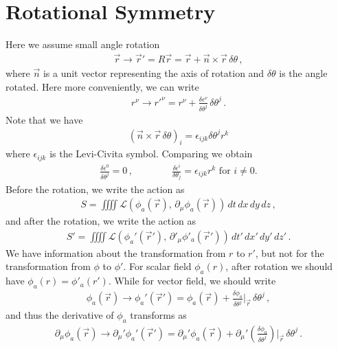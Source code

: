 \documentclass[11pt, onesided]{book}
\theoremstyle{break}
\theoremstyle{break}
\newcommand{\pd}{\partial}
\begin{document}
\section[Rotational Symmetry]{\color{red}Rotational Symmetry\color{black}}
Here we assume small angle rotation
\begin{align*}
\vec{r} \to \vec{r}' = R\vec{r} = \vec{r}+\vec{n}\times \vec{r} \, \delta \theta\,,
\end{align*}
where $\vec{n}$ is a unit vector representing the axis of rotation and $\delta\theta$ is the angle rotated. Here more conveniently, we can write
\begin{align}
r^\nu \to r'^\nu = r^\nu + \frac{\delta \epsilon^\nu}{\delta \theta^j}\, \delta \theta^j\,.
\end{align}
Note that we have
\begin{align*}
\left( \vec{n}\times \vec{r}\, \delta \theta\right)_i = \epsilon_{ijk}\delta\theta^j r^k
\end{align*}
where $\epsilon_{ijk}$ is the Levi-Civita symbol. Comparing we obtain
\begin{align*}
\frac{\delta \epsilon^0}{\delta\theta^j} = 0\,,\qquad\qquad \frac{\delta \epsilon^i}{\delta \theta_j}=\epsilon_{ijk}r^k \text{ for }i\neq 0.
\end{align*} 
Before the rotation, we write the action as
\begin{align*}
S = \iiiint \mathcal{L}\left(\phi_a(\vec{r}), \, \pd_\mu\phi_a(\vec{r})\right) \,dt\,dx\,dy\,dz\,,
\end{align*}
and after the rotation, we write the action as
\begin{align*}
S' = \iiiint \mathcal{L}\left(\phi_a'(\vec{r}') ,\, \pd'_\mu\phi'_a(\vec{r}')\right)\, dt'\,dx'\,dy'\,dz'\,.
\end{align*}
We have information about the transformation from $r$ to $r'$, but not for the transformation from $\phi$ to $\phi'$. For scalar field $\phi_a(r)$, after rotation we should have $\phi_a(r) = \phi'_a(r')$. While for vector field, we should write
\begin{align*}
\phi_a(\vec{r}) \to \phi_a'(\vec{r}') = \phi_a(\vec{r}) + \frac{\delta \phi_a}{\delta \theta^j}|_{\vec{r}}\, \delta \theta^j\,,
\end{align*}
and thus the derivative of $\phi_a$ transforms as
\begin{align*}
\pd_\mu \phi_a(\vec{r}) \to \pd_\mu'\phi_a'(\vec{r}') = \pd_\mu'\phi_a(\vec{r}) + 
\pd_\mu' \left( \frac{\delta \phi_a}{\delta \theta^j}\right)|_{\vec{r}} \,\delta \theta^j\,.
\end{align*}
\end{document}
